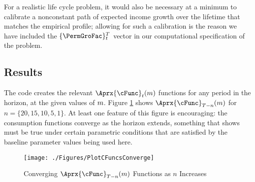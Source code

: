 \documentclass[SolvingMicroDSOPs]{subfiles}
\begin{document}
For a realistic life cycle problem, it would also be necessary at a
minimum to calibrate a nonconstant path of expected income growth over the
lifetime that matches the empirical profile; allowing for such
a calibration is the reason we have included the $\{\PermGroFac\}_{\prd}^{T}$
vector in our computational specification of the problem.

\hypertarget{results}{}
\subsection{Results}

The code creates the relevant $\Aprx{\cFunc}_{\prd}(\mNrm)$ functions for any period in the horizon, at the given values of $m$.  Figure \ref{fig:PlotCFuncsConverge} shows $\Aprx{\cFunc}_{T-n}(m)$ for $n=\{20,15,10,5,1\}$.  At least one feature of this figure is encouraging: the consumption functions converge as the horizon extends, something that \cite{BufferStockTheory} shows must be true under certain parametric conditions that are satisfied by the baseline parameter values being used here.

\hypertarget{PlotCFuncsConverge}{}
\begin{figure}
  \texttt{[image: ./Figures/PlotCFuncsConverge]}
  \caption{Converging $\Aprx{\cFunc}_{T-n}(\mNrm)$ Functions as $n$ Increases}
  \label{fig:PlotCFuncsConverge}
\end{figure}
\end{document}
